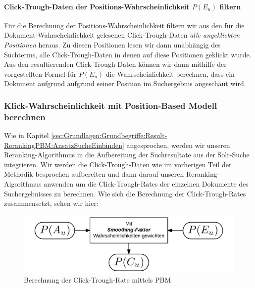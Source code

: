 \paragraph{Click-Trough-Daten der Positions-Wahrscheinlichkeit $P(E_{u})$ filtern}
Für die Berechnung der Positions-Wahrscheinlichkeit filtern wir aus den für die Dokument-Wahrscheinlichkeit
gelesenen Click-Trough-Daten \textit{alle angeklickten Positionen} heraus. Zu diesen Positionen lesen wir dann unabhängig des Suchterms, alle Click-Trough-Daten in denen auf diese Positionen geklickt wurde. Aus den resultierenden Click-Trough-Daten können wir dann mithilfe der vorgestellten Formel für $P(E_{u})$ die Wahrscheinlichkeit berechnen, dass ein Dokument aufgrund aufgrund seiner Position im Suchergebnis angeschaut wird.

\subsubsection{Klick-Wahrscheinlichkeit mit Position-Based Modell berechnen}
\label{sec:Reranking:Methodik:Result-RerankingPBM:Klick-Wahrscheinlichkeit}

Wie in Kapitel \ref{sec:Grundlagen:Grundbegriffe:Result-RerankingPBM:AnsatzSucheEinbinden} angesprochen, werden wir unseren Reranking-Algorithmus in die Aufbereitung der Suchresultate aus der Solr-Suche integrieren. Wir werden die Click-Trough-Daten wie im vorherigen Teil der Methodik besprochen aufbereiten und dann darauf unseren Reranking-Algorithmus anwenden um die Click-Trough-Rates der einzelnen Dokumente des Suchergebnisses zu berechnen. Wie sich die Berechnung der Click-Trough-Rates zusammensetzt, sehen wir hier:

\begin{figure}[H]
\centering
\vspace{-1em}
\caption[Berechnung der Click-Trough-Rate mittels PBM]{Berechnung der Click-Trough-Rate mittels PBM}
\label{fig:BerechnungCTRmittelsPBM}
\includegraphics[width=.5\linewidth]{gfx/BerechnungCTRmittelsPBM}
\vspace{-2.5em}
\end{figure}

